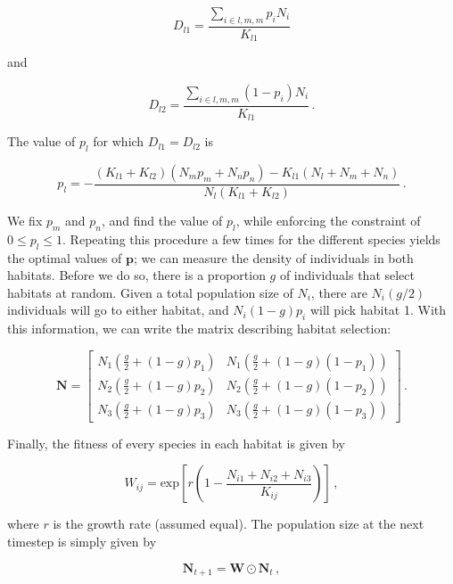 \documentclass[10pt,a4paper,onecolumn]{article}
\begin{document}
\begin{equation}
D_{l1} = \frac{\sum_{i\in l,m,m}p_iN_i}{K_{l1}}
\end{equation}

and

\begin{equation}
D_{l2} = \frac{\sum_{i\in l,m,m}(1-p_i)N_i}{K_{l1}} \,.
\end{equation}

The value of \(p_l\) for which \(D_{l1}=D_{l2}\) is

\begin{equation}
p_l = - \frac{(K_{l1}+K_{l2})(N_mp_m+N_np_n)-K_{l1}(N_l+N_m+N_n)}{N_l(K_{l1}+K_{l2})} \,.
\end{equation}

We fix \(p_m\) and \(p_n\), and find the value of \(p_l\), while
enforcing the constraint of \(0 \leq p_l \leq 1\). Repeating this
procedure a few times for the different species yields the optimal
values of \(\mathbf{p}\); we can measure the density of individuals in
both habitats. Before we do so, there is a proportion \(g\) of
individuals that select habitats at random. Given a total population
size of \(N_i\), there are \(N_i(g/2)\) individuals will go to either
habitat, and \(N_i(1-g)p_i\) will pick habitat 1. With this information,
we can write the matrix describing habitat selection:

\begin{equation}
\mathbf{N} = \begin{bmatrix}
  N_1(\frac{g}{2}+(1-g)p_1) & N_1(\frac{g}{2}+(1-g)(1-p_1))\\
  N_2(\frac{g}{2}+(1-g)p_2) & N_2(\frac{g}{2}+(1-g)(1-p_2))\\
  N_3(\frac{g}{2}+(1-g)p_3) & N_3(\frac{g}{2}+(1-g)(1-p_3))
\end{bmatrix} \,.
\end{equation}

Finally, the fitness of every species in each habitat is given by

\begin{equation}
W_{ij} = \text{exp}\left[r\left(1-\frac{N_{i1}+N_{i2}+N_{i3}}{K_{ij}}\right)\right] \,,
\end{equation}

where \(r\) is the growth rate (assumed equal). The population size at
the next timestep is simply given by

\begin{equation}
\mathbf{N}_{t+1} = \mathbf{W}\odot \mathbf{N}_{t} \,,
\end{equation}
\end{document}

